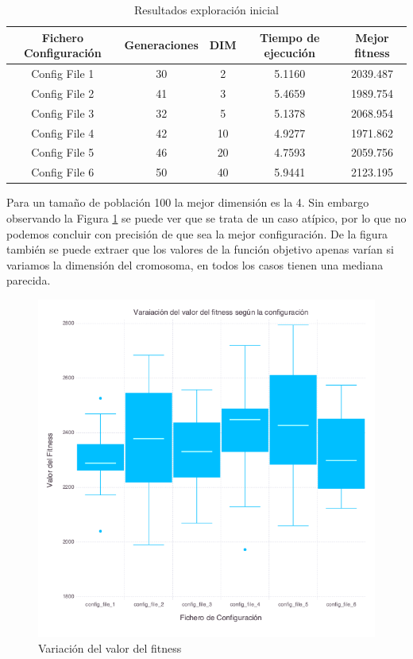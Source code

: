 \begin{table}[]
    \centering
    \begin{tabular}{||c|c|c|c|c||}
        \hline
        \textbf{Fichero Configuración} & \textbf{Generaciones} & \textbf{DIM} & \textbf{Tiempo de ejecución} & \textbf{Mejor fitness} \\ \hline
        Config File 1   & 30    & 2   & 5.1160  & 2039.487   \\ \hline
        Config File 2   & 41    & 3   & 5.4659  & 1989.754   \\ \hline
        Config File 3   & 32    & 5   & 5.1378  & 2068.954   \\ \hline
        Config File 4   & 42    & 10  & 4.9277  & 1971.862   \\ \hline
        Config File 5   & 46    & 20  & 4.7593  & 2059.756   \\ \hline
        Config File 6   & 50    & 40  & 5.9441  & 2123.195   \\ \hline
    \end{tabular}
    \caption{Resultados exploración inicial}
    \label{tab:fitness_variation}
\end{table}


Para un tamaño de población 100 la mejor dimensión es la 4. Sin embargo observando la Figura \ref{fig:box_plots} se puede ver que se trata de
un caso atípico, por lo que no podemos concluir con precisión de que sea la mejor configuración. De la figura también se puede extraer que 
los valores de la función objetivo apenas varían si variamos la dimensión del cromosoma, en todos los casos tienen una mediana parecida.

\begin{figure}[]
	\centering	
	\includegraphics[scale=0.4]{figuras/config_file_1-6_Rastrigin_box_plots.png}
	\caption{ Variación del valor del fitness }
    \label{fig:box_plots}
\end{figure}

